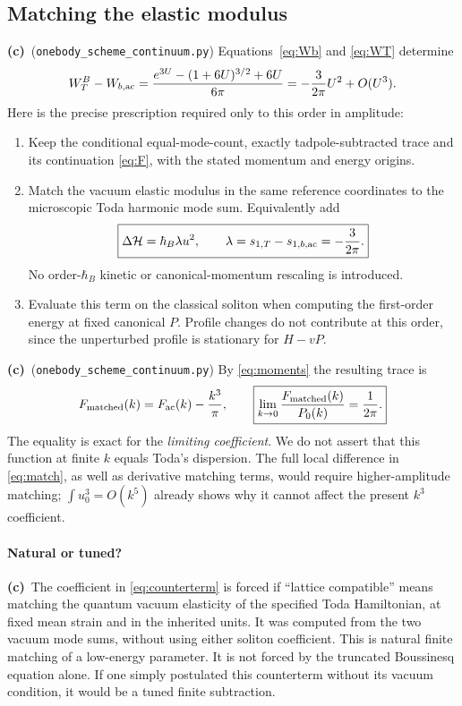 \documentclass[11pt,a4paper]{article}
\newcommand{\Lc}{\textbf{(c)}\ }
\newcommand{\ccheck}{\texttt{onebody\_\allowbreak scheme\_\allowbreak continuum.py}}
\begin{document}
\subsection{Matching the elastic modulus}
\Lc (\ccheck) Equations~\eqref{eq:Wb} and \eqref{eq:WT} determine
\begin{equation}\label{eq:match}
 W_T^B-W_{b,\rm ac}
 =\frac{e^{3U}-(1+6U)^{3/2}+6U}{6\pi}
 =-\frac3{2\pi}U^2+O(U^3).
\end{equation}
Here is the precise prescription required only to this order in amplitude:
\begin{enumerate}
\item Keep the conditional equal-mode-count, exactly tadpole-subtracted
trace and its continuation \eqref{eq:F}, with the stated momentum and energy
origins.
\item Match the vacuum elastic modulus in the same reference coordinates
to the microscopic Toda harmonic mode sum. Equivalently add
\begin{equation}\label{eq:counterterm}
 \boxed{\Delta\mathcal H=\hbar_B\lambda u^2,
       \qquad\lambda=s_{1,T}-s_{1,b,\rm ac}=-\frac3{2\pi}.}
\end{equation}
No order-$\hbar_B$ kinetic or canonical-momentum rescaling is introduced.
\item Evaluate this term on the classical soliton when computing the
first-order energy at fixed canonical $P$. Profile changes do not contribute
at this order, since the unperturbed profile is stationary for $H-vP$.
\end{enumerate}
\Lc (\ccheck) By \eqref{eq:moments} the resulting trace is
\begin{equation}\label{eq:matched}
 F_{\rm matched}(k)=F_{\rm ac}(k)-\frac{k^3}{\pi},\qquad
 \boxed{\lim_{k\to0}\frac{F_{\rm matched}(k)}{P_0(k)}=\frac1{2\pi}.}
\end{equation}
The equality is exact for the \emph{limiting coefficient}. We do not assert
that this function at finite $k$ equals Toda's dispersion. The full local
difference in \eqref{eq:match}, as well as derivative matching terms, would
require higher-amplitude matching; $\int u_0^3=O(k^5)$ already shows why
it cannot affect the present $k^3$ coefficient.

\paragraph{Natural or tuned?}
\Lc The coefficient in \eqref{eq:counterterm} is forced if ``lattice
compatible'' means matching the quantum vacuum elasticity of the specified
Toda Hamiltonian, at fixed mean strain and in the inherited units. It was
computed from the two vacuum mode sums, without using either soliton
coefficient. This is natural finite matching of a low-energy parameter.
It is not forced by the truncated Boussinesq equation alone. If one simply
postulated this counterterm without its vacuum condition, it would be a
tuned finite subtraction.
\end{document}
